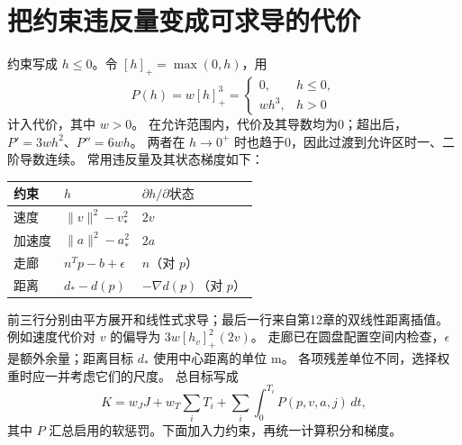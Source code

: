\section{把约束违反量变成可求导的代价}
约束写成 $h\le0$。令 $[h]_+=\max(0,h)$，用
\[
 P(h)=w[h]_+^3=\begin{cases}0,&h\le0,\\wh^3,&h>0\end{cases}
\]
计入代价，其中 $w>0$。
在允许范围内，代价及其导数均为0；超出后，$P'=3wh^2$、$P''=6wh$。
两者在 $h\to0^+$ 时也趋于0，因此过渡到允许区时一、二阶导数连续。
常用违反量及其状态梯度如下：
\begin{center}\small
\begin{tabular}{lll}\toprule
约束 & $h$ & $\partial h/\partial\text{状态}$\\\midrule
速度 & $\|v\|^2-v_*^2$ & $2v$\\
加速度 & $\|a\|^2-a_*^2$ & $2a$\\
走廊 & $n^Tp-b+\epsilon$ & $n$（对 $p$）\\
距离 & $d_*-d(p)$ & $-\nabla d(p)$（对 $p$）\\\bottomrule
\end{tabular}
\end{center}
前三行分别由平方展开和线性式求导；最后一行来自第12章的双线性距离插值。
例如速度代价对 $v$ 的偏导为 $3w[h_v]_+^2(2v)$。
走廊已在圆盘配置空间内检查，$\epsilon$ 是额外余量；距离目标 $d_*$ 使用中心距离的单位 m。
各项残差单位不同，选择权重时应一并考虑它们的尺度。
总目标写成
\begin{equation}
 K=w_JJ+w_T\sum_i T_i+\sum_i\int_0^{T_i}P(p,v,a,j)\,dt,
 \label{eq:minco-outer}
\end{equation}
其中 $P$ 汇总启用的软惩罚。下面加入力约束，再统一计算积分和梯度。

\clearpage
